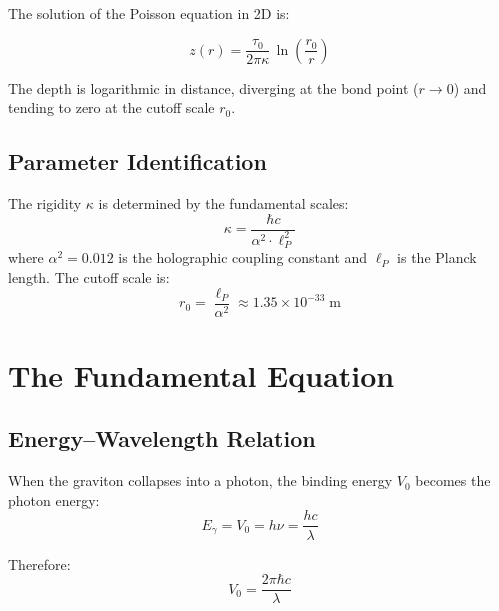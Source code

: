 \documentclass[12pt,a4paper,twoside]{article}
\newcommand{\alphaii}{\alpha^{2}}
\begin{document}
The solution of the Poisson equation in 2D is:
\begin{equationbox}[title={Logarithmic Depth}]
\begin{equation}
z(r) = \frac{\tau_0}{2\pi\kappa}\,\ln\!\left(\frac{r_0}{r}\right)
\label{eq:profundidade_log}
\end{equation}
\end{equationbox}

\noindent The depth is logarithmic in distance, diverging at the bond point ($r \to 0$) and tending to zero at the cutoff scale $r_0$.

\subsection{Parameter Identification}

The rigidity $\kappa$ is determined by the fundamental scales:
\begin{equation}
\kappa = \frac{\hbar c}{\alphaii\cdot\ell_P^2}
\label{eq:rigidez}
\end{equation}
where $\alphaii = 0.012$ is the holographic coupling constant and $\ell_P$ is the Planck length. The cutoff scale is:
\begin{equation}
r_0 = \frac{\ell_P}{\alphaii} \approx 1.35 \times 10^{-33}\;\text{m}
\label{eq:escala_corte}
\end{equation}


\section{The Fundamental Equation}


\subsection{Energy--Wavelength Relation}

When the graviton collapses into a photon, the binding energy $V_0$ becomes the photon energy:
\begin{equation}
E_\gamma = V_0 = h\nu = \frac{hc}{\lambda}
\label{eq:foton_energia}
\end{equation}

Therefore:
\begin{equation}
V_0 = \frac{2\pi\hbar c}{\lambda}
\label{eq:V0_lambda}
\end{equation}
\end{document}
